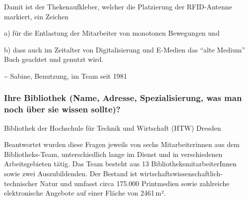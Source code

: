 Damit ist der Thekenaufkleber, welcher die Platzierung der RFID-Antenne
markiert, ein Zeichen

a) für die Entlastung der Mitarbeiter von monotonen Bewegungen und

b) dass auch im Zeitalter von Digitalisierung und E-Medien das
\enquote{alte Medium} Buch geachtet und genutzt wird.

\textasciitilde{} Sabine, Benutzung, im Team seit 1981

\hypertarget{ihre-bibliothek-name-adresse-spezialisierung-was-man-noch-uxfcber-sie-wissen-sollte}{%
\subsubsection{Ihre Bibliothek (Name, Adresse, Spezialisierung, was man noch
über sie wissen
sollte)?}\label{ihre-bibliothek-name-adresse-spezialisierung-was-man-noch-uxfcber-sie-wissen-sollte}}

Bibliothek der Hochschule für Technik und Wirtschaft (HTW) Dresden

Beantwortet wurden diese Fragen jeweils von sechs Mitarbeiterinnen aus
dem Bibliotheks-Team, unterschiedlich lange im Dienst und in
verschiedenen Arbeitsgebieten tätig. Das Team besteht aus 13
BibliotheksmitarbeiterInnen sowie zwei Auszubildenden. Der Bestand ist
wirtschafts\-wissenschaftlich-technischer Natur und umfasst circa 175.000
Printmedien sowie zahlreiche elektronische Angebote auf einer Fläche von
2461\,m².

